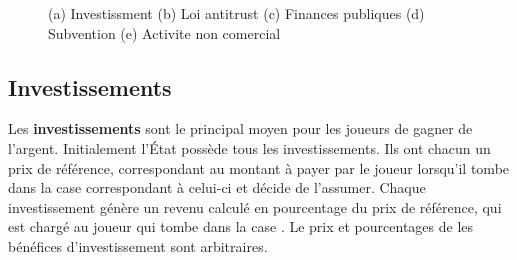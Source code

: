 \documentclass[12pt]{article}
\begin{document}
    \begin{figure}
    \centering

   
    \caption{(a) Investissment (b) Loi antitrust (c) Finances publiques (d) Subvention (e) Activite non comercial}
    \label{fig:foobar}
\end{figure}



    \subsection{Investissements}
	Les \textbf{investissements} sont le principal moyen pour les joueurs de gagner de l'argent. Initialement
l'\'Etat possède tous les investissements. Ils ont chacun un prix de référence, correspondant au
montant à payer par le joueur lorsqu'il tombe dans la case correspondant à celui-ci et décide de l'assumer.
Chaque investissement génère un revenu calculé en pourcentage du prix de
référence, qui est chargé au joueur qui tombe dans la case . 
Le prix et pourcentages de les bénéfices d'investissement sont arbitraires.
\end{document}

